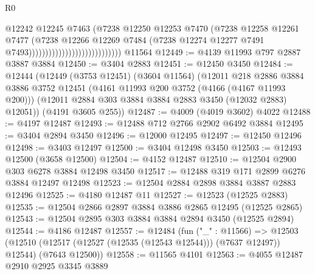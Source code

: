 \begin{lexlean}{R0}
\begin{coremodule}
                                                    @12242
                                                    @12245
                                                    @7463
                                                    (@7238
                                                      @12250
                                                      @12253
                                                      @7470
                                                      (@7238
                                                        @12258
                                                        @12261
                                                        @7477
                                                        (@7238
                                                          @12266
                                                          @12269
                                                          @7484
                                                          (@7238
                                                            @12274
                                                            @12277
                                                            @7491
                                                            @7493))))))))))))))))))))))))))))
    @11564
@12449 := @4139 @11993 @797 @2887 @3887 @3884
@12450 := @3404 @2883
@12451 := @12450 @3450
@12484 := @12444
    (@12449
      (@3753 @12451)
      (@3604 @11564)
      (@12011
        @218
        @2886
        @3884
        @3886
        @3752
        @12451
        (@4161 @11993 @200 @3752 (@4166 (@4167 @11993 @200)))
        (@12011 @2884 @303 @3884 @3884 @2883 @3450 (@12032 @2883) @12051))
      (@4191 @3605 @255))
@12487 := @4009 (@4019 @3602) @4022
@12488 := @4197 @12487
@12493 := @12488 @712 @2766 @2902 @6492 @3884
@12495 := @3404 @2894 @3450
@12496 := @12000 @12495
@12497 := @12450 @12496
@12498 := @3403 @12497
@12500 := @3404 @12498 @3450
@12503 := @12493 @12500 (@3658 @12500)
@12504 := @4152 @12487
@12510 := @12504 @2900 @303 @6278 @3884 @12498 @3450
@12517 := @12488 @319 @171 @2899 @6276 @3884 @12497 @12498
@12523 := @12504 @2884 @2898 @3884 @3887 @2883 @12496
@12525 := @4180 @12487 @11
@12527 := @12523 (@12525 @2883)
@12535 := @12504 @2866 @2897 @3884 @3886 @2865 @12495 (@12525 @2865)
@12543 := @12504 @2895 @303 @3884 @3884 @2894 @3450 (@12525 @2894)
@12544 := @4186 @12487
@12557 := @12484
    (fun ("_" : @11566) =>
    @12503 (@12510 (@12517 (@12527 (@12535 (@12543 @12544))) (@7637 @12497)) @12544) (@7643 @12500))
@12558 := @11565 @4101
@12563 := @4055 @12487 @2910 @2925 @3345 @3889

\end{coremodule}
\end{lexlean}
